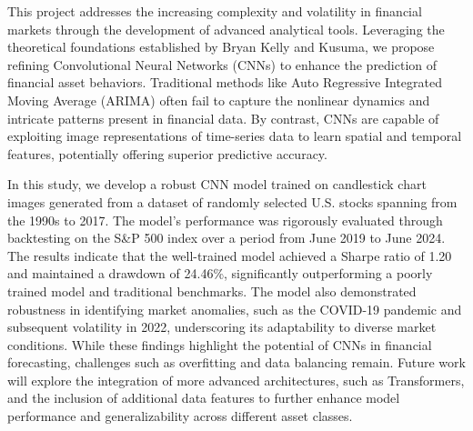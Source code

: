 
This project addresses the increasing complexity and volatility in financial markets through the development of advanced analytical tools. Leveraging the theoretical foundations established by Bryan Kelly and Kusuma, we propose refining Convolutional Neural Networks (CNNs) to enhance the prediction of financial asset behaviors. Traditional methods like Auto Regressive Integrated Moving Average (ARIMA) often fail to capture the nonlinear dynamics and intricate patterns present in financial data. By contrast, CNNs are capable of exploiting image representations of time-series data to learn spatial and temporal features, potentially offering superior predictive accuracy. 

In this study, we develop a robust CNN model trained on candlestick chart images generated from a dataset of randomly selected U.S. stocks spanning from the 1990s to 2017. The model's performance was rigorously evaluated through backtesting on the S\&P 500 index over a period from June 2019 to June 2024. The results indicate that the well-trained model achieved a Sharpe ratio of 1.20 and maintained a drawdown of 24.46\%, significantly outperforming a poorly trained model and traditional benchmarks. The model also demonstrated robustness in identifying market anomalies, such as the COVID-19 pandemic and subsequent volatility in 2022, underscoring its adaptability to diverse market conditions. While these findings highlight the potential of CNNs in financial forecasting, challenges such as overfitting and data balancing remain. Future work will explore the integration of more advanced architectures, such as Transformers, and the inclusion of additional data features to further enhance model performance and generalizability across different asset classes.

